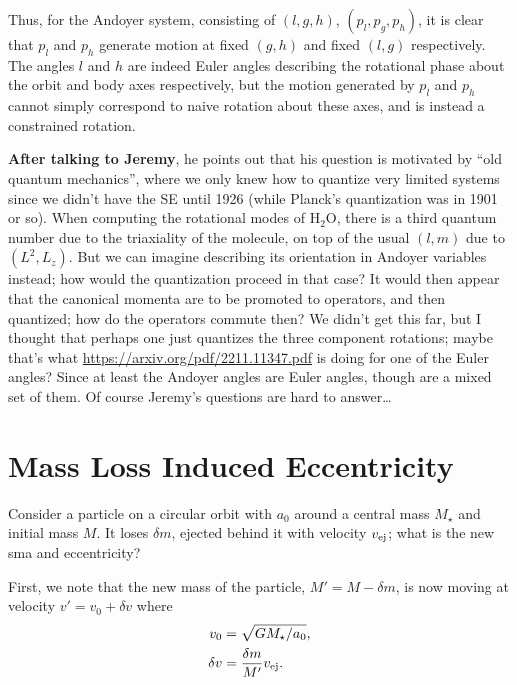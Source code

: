 \documentclass[12pt]{article}
\begin{document}
Thus, for the Andoyer system, consisting of $(l, g, h)$, $(p_l, p_g, p_h)$, it
is clear that $p_l$ and $p_h$ generate motion at fixed $(g, h)$ and fixed $(l,
g)$ respectively. The angles $l$ and $h$ are indeed Euler angles describing the
rotational phase about the orbit and body axes respectively, but the motion
generated by $p_l$ and $p_h$ cannot simply correspond to naive rotation about
these axes, and is instead a constrained rotation.

\textbf{After talking to Jeremy}, he points out that his question is motivated
by ``old quantum mechanics'', where we only knew how to quantize very limited
systems since we didn't have the SE until 1926 (while Planck's quantization was
in 1901 or so). When computing the rotational modes of H$_2$O, there is a third
quantum number due to the triaxiality of the molecule, on top of the usual $(l,
m)$ due to $(L^2, L_z)$. But we can imagine describing its orientation in
Andoyer variables instead; how would the quantization proceed in that case? It
would then appear that the canonical momenta are to be promoted to operators,
and then quantized; how do the operators commute then? We didn't get this far,
but I thought that perhaps one just quantizes the three component rotations;
maybe that's what \url{https://arxiv.org/pdf/2211.11347.pdf} is doing for one of
the Euler angles? Since at least the Andoyer angles are Euler angles, though are
a mixed set of them. Of course Jeremy's questions are hard to answer\dots

\section{Mass Loss Induced Eccentricity}

Consider a particle on a circular orbit with $a_0$ around a central mass
$M_\star$ and initial mass $M$. It loses $\delta m$, ejected behind it with
velocity $v_{\rm ej}$; what is the new sma and eccentricity?

First, we note that the new mass of the particle, $M' = M - \delta m$, is now
moving at velocity $v' = v_0 + \delta v$ where
\begin{align}
    v_0 &= \sqrt{GM_\star / a_0},\\
    \delta v &= \frac{\delta m}{M'}v_{\rm ej}.
\end{align}
\end{document}
